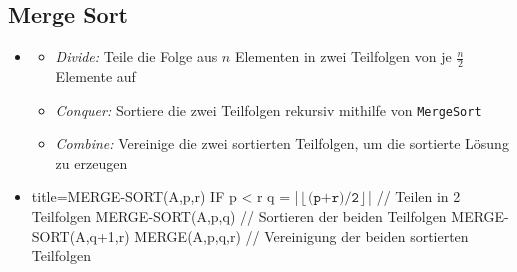 \documentclass[
    ngerman,
    color=3b,
    load_common, %
    summary,
    boxarc,
]{tuda_summary}
\begin{document}
\subsection{Merge Sort} \label{Merge Sort}
\begin{itemize}
    \item {}
          \begin{itemize}
              \item \textit{Divide:} Teile die Folge aus $n$ Elementen in zwei Teilfolgen von je $\frac{n}{2}$ Elemente auf
              \item \textit{Conquer:} Sortiere die zwei Teilfolgen rekursiv mithilfe von \texttt{MergeSort}
              \item \textit{Combine:} Vereinige die zwei sortierten Teilfolgen, um die sortierte Lösung zu erzeugen
          \end{itemize}
    \item {}
          \begin{codeBlock}[autogobble,escapeinside=||]{title={MERGE-SORT(A,p,r)}}
              IF p < r
                q = |$\left \lfloor \texttt{(p+r)/2} \right \rfloor$| // Teilen in 2 Teilfolgen
                MERGE-SORT(A,p,q) // Sortieren der beiden Teilfolgen
                MERGE-SORT(A,q+1,r)
                MERGE(A,p,q,r) // Vereinigung der beiden sortierten Teilfolgen
          \end{codeBlock}
          

\end{itemize}
\end{document}
